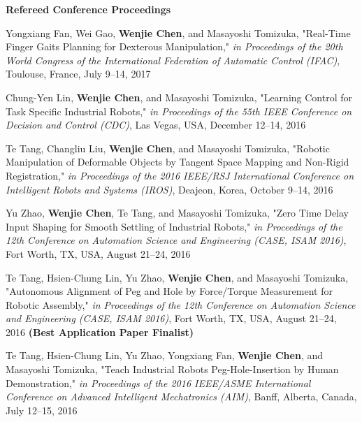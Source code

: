 \documentclass{res}
\begin{document}
\begin{resume}
    \textbf{Refereed Conference Proceedings} %
    \begin{etaremune}[start=26]
    \item Yongxiang Fan, Wei Gao, \textbf{Wenjie Chen}, and Masayoshi Tomizuka, "Real-Time Finger Gaits Planning for Dexterous Manipulation," \emph{in Proceedings of the 20th World Congress of the International Federation of Automatic Control (IFAC)}, Toulouse, France, July 9--14, 2017
    \item Chung-Yen Lin, \textbf{Wenjie Chen}, and Masayoshi Tomizuka, "Learning Control for Task Specific Industrial Robots," \emph{in Proceedings of the 55th IEEE Conference on Decision and Control (CDC)}, Las Vegas, USA, December 12--14, 2016
	\item Te Tang, Changliu Liu, \textbf{Wenjie Chen}, and Masayoshi Tomizuka, "Robotic Manipulation of Deformable Objects by Tangent Space Mapping and Non-Rigid Registration," \emph{in Proceedings of the 2016 IEEE/RSJ International Conference on Intelligent Robots and Systems (IROS)}, Deajeon, Korea, October 9--14, 2016
	\item Yu Zhao, \textbf{Wenjie Chen}, Te Tang, and Masayoshi Tomizuka, "Zero Time Delay Input Shaping for Smooth Settling of Industrial Robots," \emph{in Proceedings of the 12th Conference on Automation Science and Engineering (CASE, ISAM 2016)}, Fort Worth, TX, USA, August 21--24, 2016
	\item Te Tang, Hsien-Chung Lin, Yu Zhao, \textbf{Wenjie Chen}, and Masayoshi Tomizuka, "Autonomous Alignment of Peg and Hole by Force/Torque Measurement for Robotic Assembly," \emph{in Proceedings of the 12th Conference on Automation Science and Engineering (CASE, ISAM 2016)}, Fort Worth, TX, USA, August 21--24, 2016 \textbf{(Best Application Paper Finalist)}
	\item Te Tang, Hsien-Chung Lin, Yu Zhao, Yongxiang Fan, \textbf{Wenjie Chen}, and Masayoshi Tomizuka, "Teach Industrial Robots Peg-Hole-Insertion by Human Demonstration," \emph{in Proceedings of the 2016 IEEE/ASME International Conference on Advanced Intelligent Mechatronics (AIM)}, Banff, Alberta, Canada, July 12--15, 2016

\end{etaremune}
\end{resume}
\end{document}
